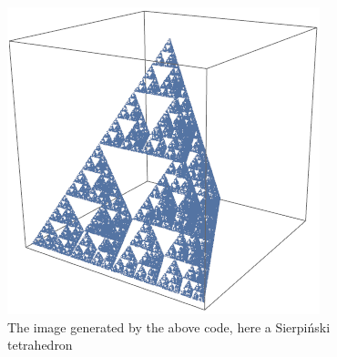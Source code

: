   \begin{figure}[htb]
        \centering
        \includegraphics[height=0.5\linewidth]{pics/ch-upper-reg/sierptetra.png}
        \caption*{The image generated by the above code, here a Sierpi{\'n}ski tetrahedron}
  \end{figure}
    
    